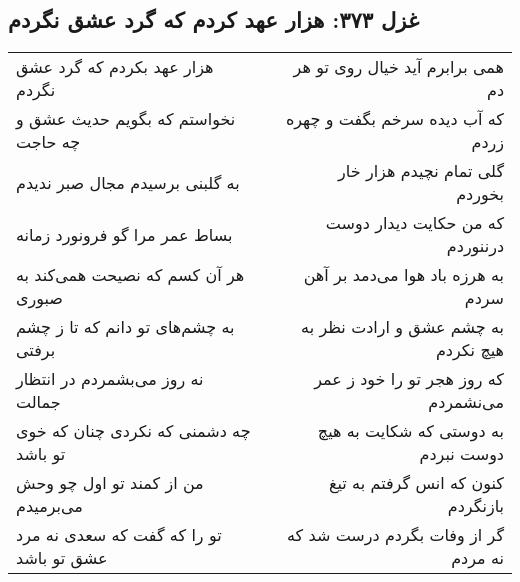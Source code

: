 \begin{center}
\section*{غزل ۳۷۳: هزار عهد کردم که گرد عشق نگردم}
\label{sec:373}
\begin{longtable}{l p{0.5cm} r}
هزار عهد بکردم که گرد عشق نگردم
&&
همی برابرم آید خیال روی تو هر دم
\\
نخواستم که بگویم حدیث عشق و چه حاجت
&&
که آب دیده سرخم بگفت و چهره زردم
\\
به گلبنی برسیدم مجال صبر ندیدم
&&
گلی تمام نچیدم هزار خار بخوردم
\\
بساط عمر مرا گو فرونورد زمانه
&&
که من حکایت دیدار دوست درننوردم
\\
هر آن کسم که نصیحت همی‌کند به صبوری
&&
به هرزه باد هوا می‌دمد بر آهن سردم
\\
به چشم‌های تو دانم که تا ز چشم برفتی
&&
به چشم عشق و ارادت نظر به هیچ نکردم
\\
نه روز می‌بشمردم در انتظار جمالت
&&
که روز هجر تو را خود ز عمر می‌نشمردم
\\
چه دشمنی که نکردی چنان که خوی تو باشد
&&
به دوستی که شکایت به هیچ دوست نبردم
\\
من از کمند تو اول چو وحش می‌برمیدم
&&
کنون که انس گرفتم به تیغ بازنگردم
\\
تو را که گفت که سعدی نه مرد عشق تو باشد
&&
گر از وفات بگردم درست شد که نه مردم
\\
\end{longtable}
\end{center}
